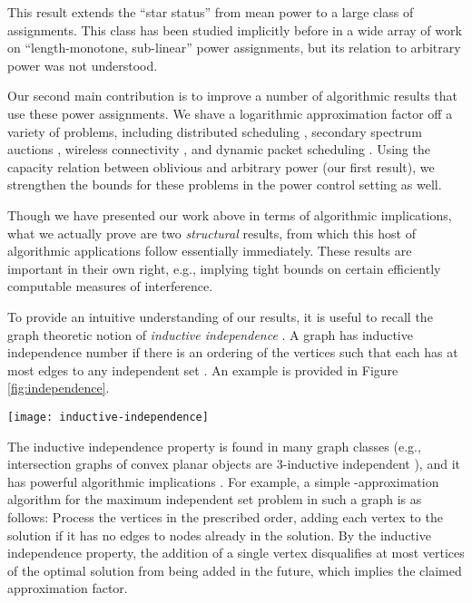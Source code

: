 \documentclass[11pt]{amsart}
\begin{document}
This result
extends the ``star status'' from mean
power to a large class of assignments. This class has been studied
implicitly before in a wide array of work \cite{SODA11,HM11a,DBLP:conf/spaa/HoeferKV11,KV10} on ``length-monotone, sub-linear'' power assignments, but
its relation to arbitrary power was not understood.

Our second main contribution is to 
improve a number of algorithmic results that use these power assignments. 
We shave a logarithmic approximation factor off
a variety of problems, including distributed scheduling \cite{KV10}, secondary spectrum auctions \cite{DBLP:conf/spaa/HoeferKV11}, wireless connectivity \cite{PODC12,HM12,MoWa06}, 
and dynamic packet scheduling \cite{sirocco12,kesselheimStability}.  Using
the capacity relation between oblivious and arbitrary power (our first result), we 
strengthen the bounds for these problems in the power control setting as well.

Though we have presented our work above in terms of algorithmic implications,
what we actually prove are two \emph{structural} results, from which this host
of algorithmic applications follow essentially immediately. 
These results are important in their own right, e.g., implying tight bounds on 
certain efficiently computable measures of interference.

To provide an intuitive understanding of our results, it is useful to
recall the graph theoretic notion of \emph{inductive independence} 
\cite{DBLP:journals/talg/YeB12}.  A graph  has inductive
independence number  if there is an ordering of the vertices  such that each  has at most  edges to any 
independent set . An example is provided in Figure \ref{fig:independence}.
\begin{figure*}[ht]
	\begin{center}
		\texttt{[image: inductive-independence]}
	\end{center}
	\caption{The graph on the left has inductive independence number , the graph on the right has inductive independence number .}\label{fig:independence}
\end{figure*}
The inductive independence property is found in many graph classes
(e.g., intersection graphs of convex planar objects are 3-inductive
independent \cite{DBLP:journals/talg/YeB12}), and it has powerful algorithmic
implications
\cite{Halldorsson00approximationsof,DBLP:conf/spaa/HoeferKV11,DBLP:journals/talg/YeB12}.
For example, a simple -approximation algorithm for the maximum
independent set problem in such a graph is as follows: Process the
vertices in the prescribed order, adding each vertex to the solution
if it has no edges to nodes already in the solution.  By the inductive
independence property, the addition of a single vertex disqualifies at
most  vertices of the optimal solution from being added in the future,
which implies the claimed approximation factor.
\end{document}
